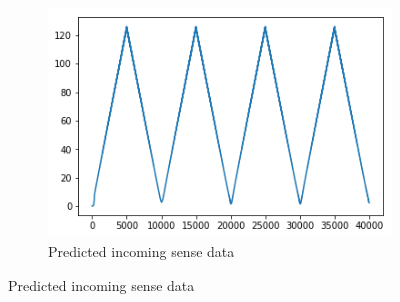 \begin{figure}[H]
\begin{subfigure}{.32\linewidth}
 \centering
 \includegraphics[width=0.8\linewidth]{chapter_3_figures/sawtooth_pred_phi.png}
 \caption{Predicted incoming sense data}
\end{subfigure}


\end{figure}
